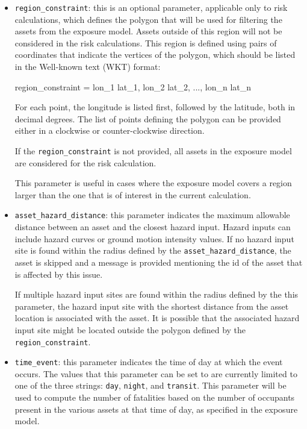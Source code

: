 \begin{itemize}

  \item \Verb+region_constraint+: this is an optional parameter, applicable
    only to risk calculations, which defines the polygon that will be used for
    filtering the assets from the exposure model. Assets outside of this region
    will not be considered in the risk calculations. This region is defined
    using pairs of coordinates that indicate the vertices of the polygon, which
    should be listed in the Well-known text (WKT) format:

    region\_constraint = lon\_1 lat\_1, lon\_2 lat\_2, ..., lon\_n lat\_n

    For each point, the longitude is listed first, followed by the latitude,
    both in decimal degrees. The list of points defining the polygon can be
    provided either in a clockwise or counter-clockwise direction.

    If the \Verb+region_constraint+ is not provided, all assets in the exposure
    model are considered for the risk calculation.

    This parameter is useful in cases where the exposure model covers a region
    larger than the one that is of interest in the current calculation.

  \item \Verb+asset_hazard_distance+: this parameter indicates the maximum
    allowable distance between an \gls{asset} and the closest hazard input.
    Hazard inputs can include hazard curves or ground motion intensity values.
    If no hazard input site is found within the radius defined by the
    \Verb+asset_hazard_distance+, the asset is skipped and a message is
    provided mentioning the id of the asset that is affected by this issue.

    If multiple hazard input sites are found within the radius defined by the
    this parameter, the hazard input site with the shortest distance from the
    asset location is associated with the asset. It is possible that the
    associated hazard input site might be located outside the polygon defined
    by the \Verb+region_constraint+.

  \item \Verb+time_event+: this parameter indicates the time of day at which
    the event occurs. The values that this parameter can be set to are 
    currently limited to one of the three strings: \Verb+day+, \Verb+night+,
    and \Verb+transit+. This parameter will be used to compute the number of
    fatalities based on the number of occupants present in the various
    \glspl{asset} at that time of day, as specified in the exposure model.

\end{itemize}


